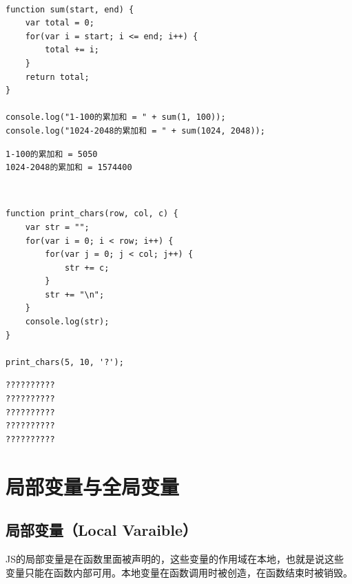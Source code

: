  \\

\begin{lstlisting}[style=htmlcssjs]
function sum(start, end) {
    var total = 0;
    for(var i = start; i <= end; i++) {
        total += i;
    }
    return total;
}

console.log("1-100的累加和 = " + sum(1, 100));
console.log("1024-2048的累加和 = " + sum(1024, 2048));
\end{lstlisting}

\begin{tcolorbox}
	\begin{verbatim}
1-100的累加和 = 5050
1024-2048的累加和 = 1574400
	\end{verbatim}
\end{tcolorbox}

\vspace{0.5cm}

 \\

\begin{lstlisting}[style=htmlcssjs]
function print_chars(row, col, c) {
    var str = "";
    for(var i = 0; i < row; i++) {
        for(var j = 0; j < col; j++) {
            str += c;
        }
        str += "\n";
    }
    console.log(str);
}

print_chars(5, 10, '?');
\end{lstlisting}

\begin{tcolorbox}
	\begin{verbatim}
??????????
??????????
??????????
??????????
??????????
	\end{verbatim}
\end{tcolorbox}

\newpage

\section{局部变量与全局变量}

\subsection{局部变量（Local Varaible）}

JS的局部变量是在函数里面被声明的，这些变量的作用域在本地，也就是说这些变量只能在函数内部可用。本地变量在函数调用时被创造，在函数结束时被销毁。 \\

